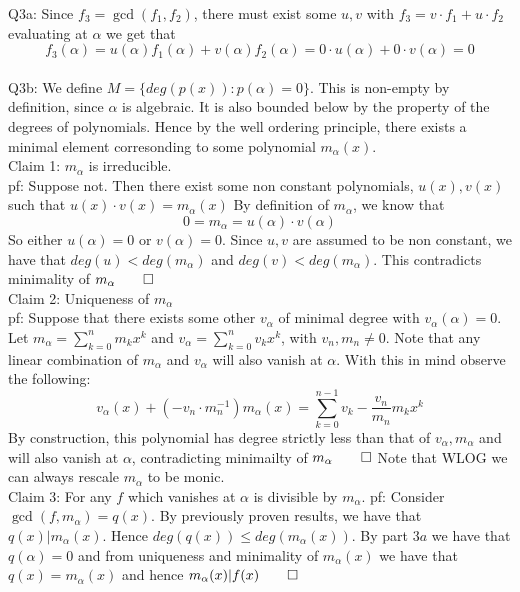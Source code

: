 \documentclass[letterpaper]{article}
\begin{document}
\noindent Q3a: Since $f_3 = \gcd(f_1,f_2)$, there must exist some $u,v$ with $f_3 = v \cdot f_1 + u\cdot f_2$ evaluating at $\alpha$ we get that $$f_3(\alpha) = u(\alpha)f_1(\alpha) + v(\alpha)f_2(\alpha) = 0\cdot u(\alpha) + 0\cdot v(\alpha) =0$$
\newline \\ Q3b: We define $M = \{ deg(p(x)) : p(\alpha)=0\}$. This is non-empty by definition, since $\alpha$ is algebraic. It is also bounded below by the property of the degrees of polynomials. Hence by the well ordering principle, there exists a minimal element corresonding to some polynomial $m_{\alpha}(x)$. \\ Claim 1: $m_\alpha$ is irreducible. 
\newline \\ pf: Suppose not. Then there exist some non constant polynomials, $u(x),v(x)$ such that $u(x)\cdot v(x)=m_\alpha(x)$ By definition of $m_{\alpha}$, we know that $$0=m_{\alpha}=u(\alpha)\cdot v(\alpha)$$ So either $u(\alpha)=0$ or $v(\alpha)=0$. Since $u,v$ are assumed to be non constant, we have that $deg(u)<deg(m_\alpha)$ and $deg(v)<deg(m_\alpha)$. This contradicts minimality of $m_\alpha \qed$ 
\\ \newline Claim 2: Uniqueness of $m_\alpha$ 
\newline \\ pf: Suppose that there exists some other $v_\alpha$ of minimal degree with $v_\alpha(\alpha)=0$. Let $m_{\alpha} = \sum_{k=0}^n m_k x^k$ and $v_\alpha = \sum_{k=0}^n v_k x^k$, with $v_n,m_n \neq 0$. Note that any linear combination of $m_\alpha$ and $v_\alpha $ will also vanish at $\alpha$. With this in mind observe the following: 
$$v_\alpha(x) + (-v_n\cdot m_n^{-1})m_{\alpha}(x) = \sum_{k=0}^{n-1} v_{k} - \frac{v_n}{m_n}m_k x^k$$ By construction, this polynomial has degree strictly less than that of $v_\alpha,m_\alpha$ and will also vanish at $\alpha$, contradicting minimailty of $m_\alpha\qed$
\newline Note that WLOG we can always rescale $m_\alpha$ to be monic. 
\\ \newline Claim 3: For any $f$ which vanishes at $\alpha$ is divisible by $m_\alpha$. 
\newline pf: Consider $\gcd(f,m_\alpha)= q(x)$. By previously proven results, we have that $q(x)|m_{\alpha}(x)$. Hence $deg(q(x))\leq deg(m_\alpha(x))$. By part $3a$ we have that $q(\alpha)=0$ and from uniqueness and minimality of $m_\alpha(x)$ we have that $q(x) = m_{\alpha}(x)$ and hence $m_\alpha(x)|f(x) \qed$
\end{document}
